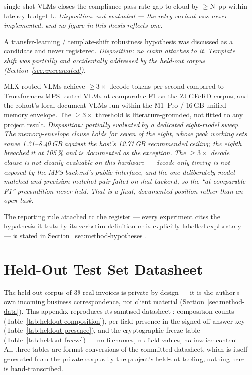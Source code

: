 \begin{description}
        single-shot \acp{VLM} closes the compliance-pass-rate gap to cloud by
        ${\geq}$N~pp within latency budget L.
        \emph{Disposition: not evaluated --- the retry variant was never
        implemented, and no figure in this thesis reflects one.}
  \item[H7 --- floated, never locked.] A transfer-learning / template-shift
        robustness hypothesis was discussed as a candidate and never registered.
        \emph{Disposition: no claim attaches to it. Template shift was partially and
        accidentally addressed by the held-out corpus
        (Section~\ref{sec:unevaluated}).}
  \item[H8 (Layer 1, efficiency) --- formalised 2026-05-31.] \ac{MLX}-routed
        \acp{VLM} achieve ${\geq}3\times$ decode tokens per second compared to
        Transformers-\ac{MPS}-routed \acp{VLM} at comparable \ac{F1} on the
        \ac{ZUGFeRD} corpus, and the cohort's local document \acp{VLM} run within
        the M1~Pro / 16\,\ac{GB} unified-memory envelope. The ${\geq}3\times$
        threshold is literature-grounded, not fitted to any project result.
        \emph{Disposition: partially evaluated by a dedicated eight-model sweep.
        The memory-envelope clause holds for seven of the eight, whose peak working
        sets range 1.31--8.40\,\ac{GB} against the host's 12.71\,\ac{GB}
        recommended ceiling; the eighth breached it at 105\,\% and is documented as
        the exception. The ${\geq}3\times$ decode clause is not cleanly evaluable on
        this hardware --- decode-only timing is not exposed by the
        \ac{MPS} backend's public interface, and the one deliberately
        model-matched and precision-matched pair failed on that backend, so the
        ``at comparable \ac{F1}'' precondition never held. That is a final,
        documented position rather than an open task.}
\end{description}
\endgroup

The reporting rule attached to the register --- every experiment cites the hypothesis
it tests by its verbatim definition or is explicitly labelled exploratory --- is
stated in Section~\ref{sec:method-hypotheses}.

\chapter{Held-Out Test Set Datasheet}
\label{app:heldout}

The held-out corpus of 39 real invoices is private by design --- it is the author's own
incoming business correspondence, not client material (Section~\ref{sec:method-data}). This
appendix reproduces its sanitised datasheet
\parencite{gebru2018datasheets}: composition counts (Table~\ref{tab:heldout-composition}),
per-field presence in the signed-off answer key (Table~\ref{tab:heldout-presence}), and
the cryptographic freeze table (Table~\ref{tab:heldout-freeze}) --- no filenames, no
field values, no invoice content. All three tables are format conversions of the committed datasheet,
which is itself generated from the private corpus by the project's held-out tooling;
nothing here is hand-transcribed.

